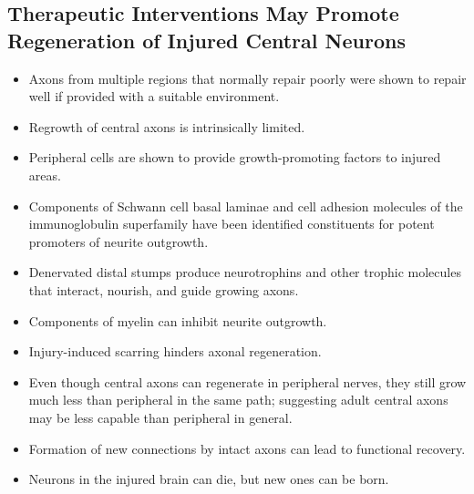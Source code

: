 \documentclass[12pt,a4paper]{article}
\begin{document}
\subsection{Therapeutic Interventions May Promote Regeneration of Injured Central Neurons}
\begin{itemize}
    \item Axons from multiple regions that normally repair poorly were shown to repair well if provided with a suitable environment.
    \item Regrowth of central axons is intrinsically limited.
    \item Peripheral cells are shown to provide growth-promoting factors to injured areas. 
    \item Components of Schwann cell basal laminae and cell adhesion molecules of the immunoglobulin superfamily have been identified constituents for potent promoters of neurite outgrowth. 
    \item Denervated distal stumps produce neurotrophins and other trophic molecules that interact, nourish, and guide growing axons. 
    \item Components of myelin can inhibit neurite outgrowth.
    \item Injury-induced scarring hinders axonal regeneration.
    \item Even though central axons can regenerate in peripheral nerves, they still grow much less than peripheral in the same path; suggesting adult central axons may be less capable than peripheral in general. 
    \item Formation of new connections by intact axons can lead to functional recovery.
    \item Neurons in the injured brain can die, but new ones can be born.
\end{itemize}



\end{document}
